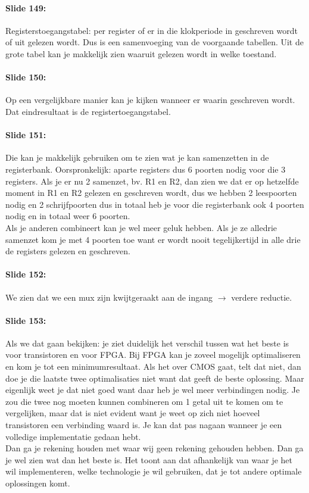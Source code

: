 \documentclass[10pt,a4paper]{book}
\begin{document}
\paragraph{Slide 149:} Registerstoegangstabel: per register of er in die klokperiode in geschreven wordt of uit gelezen wordt. Dus is een samenvoeging van de voorgaande tabellen. Uit de grote tabel kan je makkelijk zien waaruit gelezen wordt in welke toestand.

\paragraph{Slide 150:} Op een vergelijkbare manier kan je kijken wanneer er waarin geschreven wordt. Dat eindresultaat is de registertoegangstabel.

\paragraph{Slide 151:} Die kan je makkelijk gebruiken om te zien wat je kan samenzetten in de registerbank. Oorspronkelijk: aparte registers dus 6 poorten nodig voor die 3 registers. Als je er nu 2 samenzet, bv. R1 en R2, dan zien we dat er op hetzelfde moment in R1 en R2 gelezen en geschreven wordt, dus we hebben 2 leespoorten nodig en 2 schrijfpoorten dus in totaal heb je voor die registerbank ook 4 poorten nodig en in totaal weer 6 poorten.\\
Als je anderen combineert kan je wel meer geluk hebben. Als je ze alledrie samenzet kom je met 4 poorten toe want er wordt nooit tegelijkertijd in alle drie de registers gelezen en geschreven.

\paragraph{Slide 152:} We zien dat we een mux zijn kwijtgeraakt aan de ingang $\rightarrow$ verdere reductie.

\paragraph{Slide 153:} Als we dat gaan bekijken: je ziet duidelijk het verschil tussen wat het beste is voor transistoren en voor FPGA. Bij FPGA kan je zoveel mogelijk optimaliseren en kom je tot een minimumresultaat. Als het over CMOS gaat, telt dat niet, dan doe je die laatste twee optimalisaties niet want dat geeft de beste oplossing. Maar eigenlijk weet je dat niet goed want daar heb je wel meer verbindingen nodig. Je zou die twee nog moeten kunnen combineren om 1 getal uit te komen om te vergelijken, maar dat is niet evident want je weet op zich niet hoeveel transistoren een verbinding waard is. Je kan dat pas nagaan wanneer je een volledige implementatie gedaan hebt.\\
Dan ga je rekening houden met waar wij geen rekening gehouden hebben. Dan ga je wel zien wat dan het beste is. Het toont aan dat afhankelijk van waar je het wil implementeren, welke technologie je wil gebruiken, dat je tot andere optimale oplossingen komt.
\end{document}
